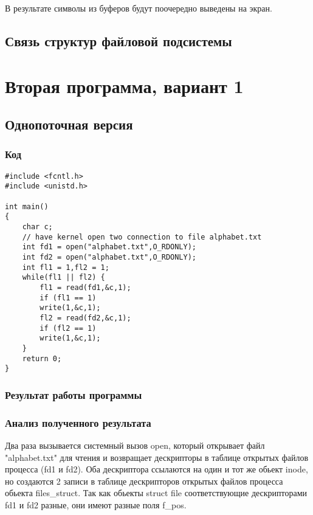 В результате символы из буферов будут поочередно выведены на экран.

\clearpage
\section{Связь структур файловой подсистемы}
\FloatBarrier
{}
\FloatBarrier



\chapter{Вторая программа, вариант 1}

\section{Однопоточная версия}

\subsection{Код}
\begin{lstlisting}[caption={Программа 2, вариант 1, однопоточной версия}, label=lst:p21]
#include <fcntl.h>
#include <unistd.h>

int main()
{
	char c;  
	// have kernel open two connection to file alphabet.txt  
	int fd1 = open("alphabet.txt",O_RDONLY);
	int fd2 = open("alphabet.txt",O_RDONLY);
	int fl1 = 1,fl2 = 1;
	while(fl1 || fl2) {
		fl1 = read(fd1,&c,1);
		if (fl1 == 1) 
		write(1,&c,1);
		fl2 = read(fd2,&c,1);
		if (fl2 == 1) 
		write(1,&c,1);
	}
	return 0;
}
\end{lstlisting}

\subsection{Результат работы программы}
\FloatBarrier
{}
\FloatBarrier

\subsection{Анализ полученного результата}

Два раза вызывается системный вызов open, который открывает файл "alphabet.txt" для чтения и возвращает дескрипторы в таблице открытых файлов процесса (fd1 и fd2). Оба дескриптора ссылаются на один и тот же обьект inode, но создаются 2 записи в таблице дескрипторов открытых файлов процесса обьекта files\_struct. Так как обьекты struct file соответствующие дескрипторами fd1 и fd2 разные, они имеют разные поля f\_pos. 

